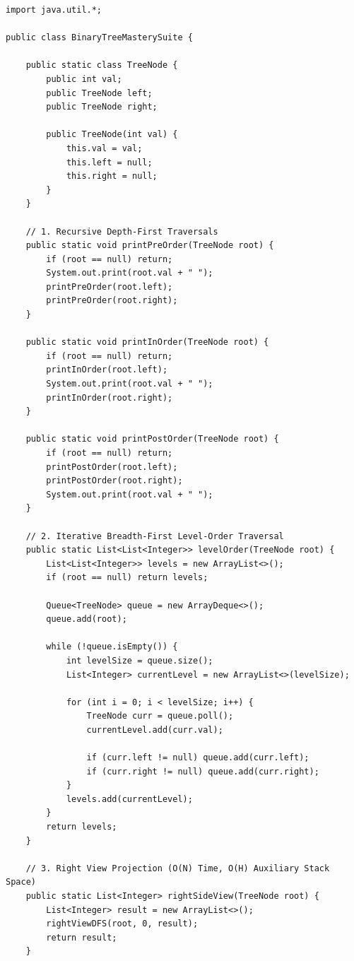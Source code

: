 \documentclass[10pt,journal,compsoc,onecolumn]{IEEEtran}
\begin{document}
\begin{verbatim}
import java.util.*;

public class BinaryTreeMasterySuite {

    public static class TreeNode {
        public int val;
        public TreeNode left;
        public TreeNode right;

        public TreeNode(int val) {
            this.val = val;
            this.left = null;
            this.right = null;
        }
    }

    // 1. Recursive Depth-First Traversals
    public static void printPreOrder(TreeNode root) {
        if (root == null) return;
        System.out.print(root.val + " ");
        printPreOrder(root.left);
        printPreOrder(root.right);
    }

    public static void printInOrder(TreeNode root) {
        if (root == null) return;
        printInOrder(root.left);
        System.out.print(root.val + " ");
        printInOrder(root.right);
    }

    public static void printPostOrder(TreeNode root) {
        if (root == null) return;
        printPostOrder(root.left);
        printPostOrder(root.right);
        System.out.print(root.val + " ");
    }

    // 2. Iterative Breadth-First Level-Order Traversal
    public static List<List<Integer>> levelOrder(TreeNode root) {
        List<List<Integer>> levels = new ArrayList<>();
        if (root == null) return levels;

        Queue<TreeNode> queue = new ArrayDeque<>();
        queue.add(root);

        while (!queue.isEmpty()) {
            int levelSize = queue.size();
            List<Integer> currentLevel = new ArrayList<>(levelSize);

            for (int i = 0; i < levelSize; i++) {
                TreeNode curr = queue.poll();
                currentLevel.add(curr.val);

                if (curr.left != null) queue.add(curr.left);
                if (curr.right != null) queue.add(curr.right);
            }
            levels.add(currentLevel);
        }
        return levels;
    }

    // 3. Right View Projection (O(N) Time, O(H) Auxiliary Stack Space)
    public static List<Integer> rightSideView(TreeNode root) {
        List<Integer> result = new ArrayList<>();
        rightViewDFS(root, 0, result);
        return result;
    }


\end{verbatim}
\end{document}
